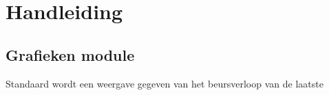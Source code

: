 \chapter{Handleiding}

\section{Grafieken module}

Standaard wordt een weergave gegeven van het beursverloop van de laatste 